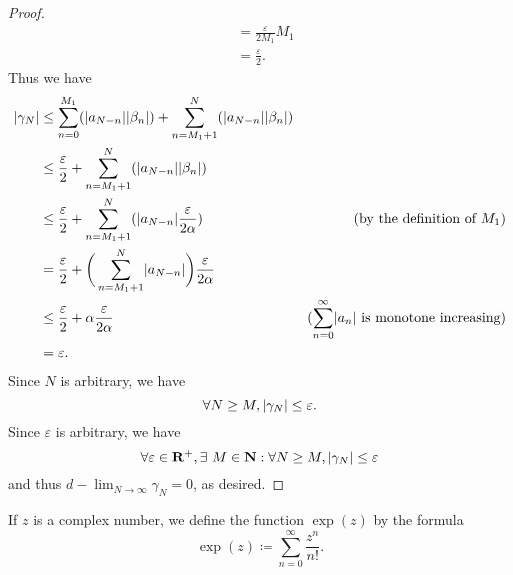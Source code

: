 \begin{proof}
\begin{align*}
                                                             & = \frac{\varepsilon}{2 M_1} M_1                                                                                                           \\
                                                             & = \frac{\varepsilon}{2}.
    \end{align*}
    Thus we have
    \begin{align*}
        \abs*{\gamma_N} & \leq \sum_{n = 0}^{M_1} (\abs*{a_{N - n}} \abs*{\beta_n}) + \sum_{n = M_1 + 1}^N (\abs*{a_{N - n}} \abs*{\beta_n})                                                                      \\
                        & \leq \frac{\varepsilon}{2} + \sum_{n = M_1 + 1}^N (\abs*{a_{N - n}} \abs*{\beta_n})                                                                                                     \\
                        & \leq \frac{\varepsilon}{2} + \sum_{n = M_1 + 1}^N (\abs*{a_{N - n}} \frac{\varepsilon}{2 \alpha})                  & \text{(by the definition of \(M_1\))}                              \\
                        & = \frac{\varepsilon}{2} + \bigg(\sum_{n = M_1 + 1}^N \abs*{a_{N - n}}\bigg) \frac{\varepsilon}{2 \alpha}                                                                                \\
                        & \leq \frac{\varepsilon}{2} + \alpha \frac{\varepsilon}{2 \alpha}                                                   & \text{(\(\sum_{n = 0}^\infty \abs*{a_n}\) is monotone increasing)} \\
                        & = \varepsilon.
    \end{align*}
    Since \(N\) is arbitrary, we have
    \[
        \forall N \geq M, \abs*{\gamma_N} \leq \varepsilon.
    \]
    Since \(\varepsilon\) is arbitrary, we have
    \[
        \forall \varepsilon \in \mathbf{R}^+, \exists\ M \in \mathbf{N} : \forall N \geq M, \abs*{\gamma_N} \leq \varepsilon
    \]
    and thus \(d - \lim_{N \to \infty} \gamma_N = 0\), as desired.
\end{proof}

\begin{definition}\label{4.6.15}
    If \(z\) is a complex number, we define the function \(\exp(z)\) by the formula
    \[
        \exp(z) \coloneqq \sum_{n = 0}^\infty \frac{z^n}{n!}.
    \]
\end{definition}

